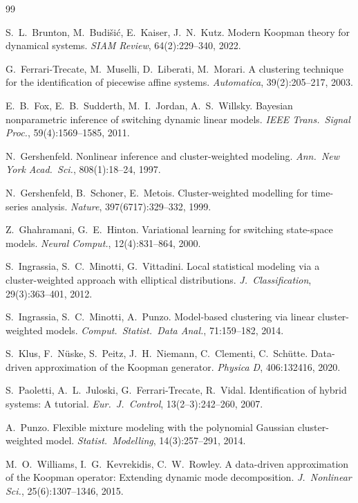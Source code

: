 \documentclass[11pt]{article}
\theoremstyle{definition}
\begin{document}
\begin{thebibliography}{99}

 S.~L.~Brunton, M.~Budi{\v{s}}i{\'c}, E.~Kaiser, J.~N.~Kutz. Modern Koopman theory for dynamical systems. \textit{SIAM Review}, 64(2):229--340, 2022.

 G.~Ferrari-Trecate, M.~Muselli, D.~Liberati, M.~Morari. A clustering technique for the identification of piecewise affine systems. \textit{Automatica}, 39(2):205--217, 2003.

 E.~B.~Fox, E.~B.~Sudderth, M.~I.~Jordan, A.~S.~Willsky. Bayesian nonparametric inference of switching dynamic linear models. \textit{IEEE Trans.\ Signal Proc.}, 59(4):1569--1585, 2011.

 N.~Gershenfeld. Nonlinear inference and cluster-weighted modeling. \textit{Ann.\ New York Acad.\ Sci.}, 808(1):18--24, 1997.

 N.~Gershenfeld, B.~Schoner, E.~Metois. Cluster-weighted modelling for time-series analysis. \textit{Nature}, 397(6717):329--332, 1999.

 Z.~Ghahramani, G.~E.~Hinton. Variational learning for switching state-space models. \textit{Neural Comput.}, 12(4):831--864, 2000.

 S.~Ingrassia, S.~C.~Minotti, G.~Vittadini. Local statistical modeling via a cluster-weighted approach with elliptical distributions. \textit{J.~Classification}, 29(3):363--401, 2012.

 S.~Ingrassia, S.~C.~Minotti, A.~Punzo. Model-based clustering via linear cluster-weighted models. \textit{Comput.\ Statist.\ Data Anal.}, 71:159--182, 2014.

 S.~Klus, F.~N{\"u}ske, S.~Peitz, J.~H.~Niemann, C.~Clementi, C.~Sch{\"u}tte. Data-driven approximation of the Koopman generator. \textit{Physica D}, 406:132416, 2020.

 S.~Paoletti, A.~L.~Juloski, G.~Ferrari-Trecate, R.~Vidal. Identification of hybrid systems: A tutorial. \textit{Eur.\ J.~Control}, 13(2--3):242--260, 2007.

 A.~Punzo. Flexible mixture modeling with the polynomial Gaussian cluster-weighted model. \textit{Statist.\ Modelling}, 14(3):257--291, 2014.

 M.~O.~Williams, I.~G.~Kevrekidis, C.~W.~Rowley. A data-driven approximation of the Koopman operator: Extending dynamic mode decomposition. \textit{J.~Nonlinear Sci.}, 25(6):1307--1346, 2015.

\end{thebibliography}
\end{document}
